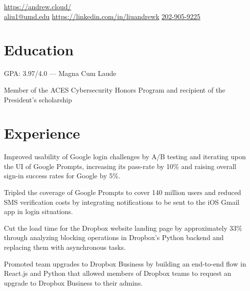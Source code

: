 \documentclass[]{template}
\begin{document}
\lastupdated

{
  \url{https://andrew.cloud/} \\
  \href{mailto:aliu1@umd.edu}{aliu1@umd.edu}
  \textcolor{black}{\textbullet}
  \href{https://linkedin.com/in/liuandrewk}{https://linkedin.com/in/liuandrewk}
  \textcolor{black}{\textbullet}
  \href{tel:2029059225}{202-905-9225}
}

\section{Education}
\begin{tightemize}
\item GPA: 3.97/4.0 --- Magna Cum Laude
\item Member of the ACES Cybersecurity Honors Program and recipient of the President's scholarship
\end{tightemize}
\sectionsep

\section{Experience}

\begin{tightemize}
\item Improved usability of Google login challenges by A/B testing and iterating upon the UI of Google Prompts, increasing its pass-rate by 10\% and raising overall sign-in success rates for Google by 5\%.
\item Tripled the coverage of Google Prompts to cover 140 million users and reduced SMS verification costs by integrating notifications to be sent to the iOS Gmail app in login situations.
\end{tightemize}
\sectionsep

\begin{tightemize}
\item Cut the load time for the Dropbox website landing page by approximately 33\% through analyzing blocking operations in Dropbox's Python backend and replacing them with asynchronous tasks.
\item Promoted team upgrades to Dropbox Business by building an end-to-end flow in React.js and Python that allowed members of Dropbox teams to request an upgrade to Dropbox Business to their admins.
\end{tightemize}
\sectionsep
\end{document}
